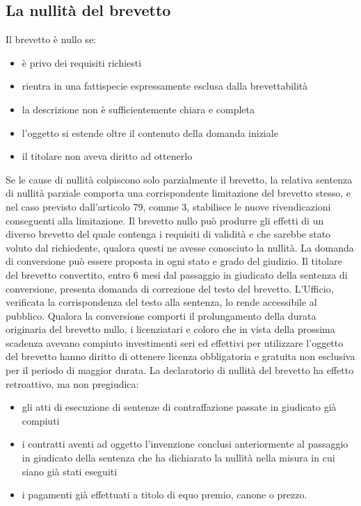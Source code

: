 \subsection{La nullità del brevetto}
Il brevetto è nullo se:
\begin{itemize}
    \item è privo dei requisiti richiesti
    \item rientra in una fattispecie espressamente esclusa dalla brevettabilità
    \item la descrizione non è sufficientemente chiara e completa
    \item l'oggetto si estende oltre il contenuto della domanda iniziale
    \item il titolare non aveva diritto ad ottenerlo
\end{itemize}
Se le cause di nullità colpiscono solo parzialmente il brevetto, la relativa sentenza di nullità parziale comporta una corrispondente
limitazione del brevetto stesso, e nel caso previsto dall'articolo 79, comme 3, stabilisce le nuove rivendicazioni conseguenti alla limitazione.\newline
Il brevetto nullo può produrre gli effetti di un diverso brevetto del quale contenga i requisiti di validità e che sarebbe stato voluto dal
richiedente, qualora questi ne avesse conosciuto la nullità. La domanda di conversione può essere proposta in ogni stato e grado del giudizio.\newline
Il titolare del brevetto convertito, entro 6 mesi dal passaggio in giudicato della sentenza di conversione, presenta domanda di correzione del testo del brevetto.
L'Ufficio, verificata la corrispondenza del testo alla sentenza, lo rende accessibile al pubblico.\newline
Qualora la conversione comporti il prolungamento della durata originaria del brevetto nullo, i licenziatari e
coloro che in vista della prossima scadenza avevano compiuto investimenti seri ed effettivi per utilizzare l'oggetto del brevetto hanno diritto di ottenere licenza obbligatoria
e gratuita non esclusiva per il periodo di maggior durata.\newline
La declaratorio di nullità del brevetto ha effetto retroattivo, ma non pregiudica:
\begin{itemize}
    \item gli atti di esecuzione di sentenze di contraffazione passate in giudicato già compiuti
    \item i contratti aventi ad oggetto l'invenzione conclusi anteriormente al passaggio in giudicato della sentenza
    che ha dichiarato la nullità nella misura in cui siano già stati eseguiti
    \item i pagamenti già effettuati a titolo di equo premio, canone o prezzo.
\end{itemize}
